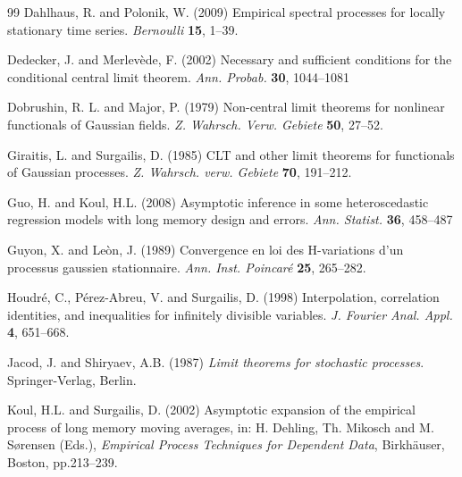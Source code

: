 \documentclass[10pt]{article}
\begin{document}
\begin{thebibliography}{99}
 Dahlhaus, R. and Polonik, W. (2009) Empirical spectral processes for locally stationary time series. {\em Bernoulli} {\bf 15},  1--39.


 Dedecker, J. and Merlev\` ede, F. (2002) Necessary and sufficient conditions for the conditional central limit theorem. {\em Ann. Probab.} {\bf 30}, 1044--1081

 Dobrushin, R. L. and Major, P. (1979)
Non-central limit theorems for nonlinear functionals of Gaussian fields.
{\em Z. Wahrsch. Verw. Gebiete} {\bf 50}, 27--52.

 Giraitis, L. and  Surgailis, D. (1985) CLT and other limit
theorems for functionals of Gaussian processes. {\em Z. Wahrsch.
verw. Gebiete} {\bf 70}, 191--212.


 Guo, H. and Koul, H.L. (2008) Asymptotic inference in some
heteroscedastic regression models with long memory design and errors. {\em Ann. Statist.} {\bf 36}, 458--487


 Guyon, X. and Le\`on, J. (1989) Convergence en loi
des H-variations d'un processus gaussien stationnaire. {\em Ann.
Inst. Poincar\'e} {\bf 25}, 265--282.


 Houdr\'e, C., P\'erez-Abreu, V. and Surgailis, D. (1998)
Interpolation, correlation identities, and inequalities for infinitely divisible variables.
{\em J. Fourier Anal. Appl.} {\bf 4}, 651--668.

 Jacod, J. and Shiryaev, A.B. (1987) {\em Limit theorems for stochastic processes}. Springer-Verlag, Berlin.



  Koul, H.L. and Surgailis, D. (2002)  Asymptotic expansion of the
empirical process of long memory moving averages, in: H. Dehling, Th. Mikosch and M. S{\o}rensen (Eds.),
{\it Empirical Process Techniques for Dependent Data}, Birkh\"auser, Boston, pp.213--239.




\end{thebibliography}
\end{document}
